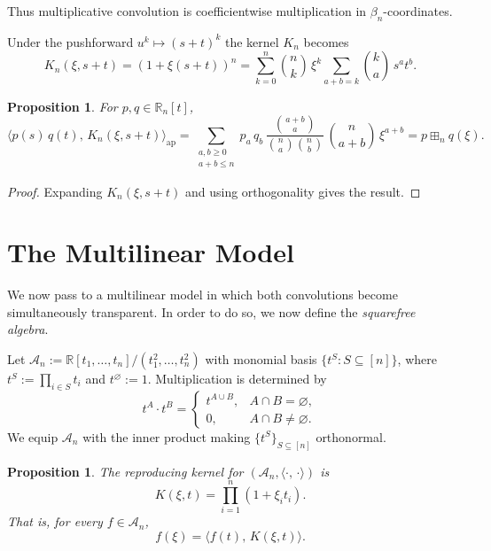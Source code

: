 \documentclass[11pt]{amsart}
\newtheorem{prop}[thm]{Proposition}
\theoremstyle{definition}
\newcommand{\R}{\mathbb{R}}
\newcommand{\ip}[2]{\langle #1,\, #2 \rangle}
\newcommand{\bn}[2]{{\textstyle\binom{#1}{#2}}}
\begin{document}
Thus multiplicative convolution is coefficientwise
multiplication in $\beta_n$-coordinates.

Under the pushforward $u^k\mapsto (s+t)^k$ the kernel $K_n$ becomes
\[
  K_n(\xi,s+t) = (1+\xi(s+t))^n
  = \sum_{k=0}^n \bn{n}{k}\,\xi^k
  \sum_{a+b=k}\bn{k}{a}\, s^a t^b.
\]

\begin{prop}\label{prop:add-conv-kernel}
For $p,q\in\R_n[t]$,
\[
  \ip{p(s)\,q(t)}{K_n(\xi,s+t)}_{\mathrm{ap}}
  = \sum_{\substack{a,b\ge 0\\ a+b\le n}}
  p_a\, q_b\,
  \frac{\binom{a+b}{a}}{\binom{n}{a}\binom{n}{b}}\,
  \binom{n}{a+b}\,\xi^{a+b} = p\boxplus_n q(\xi).
\]
\end{prop}

\begin{proof}
Expanding $K_n(\xi,s+t)$ and using orthogonality gives the
result.
\end{proof}


\section{The Multilinear Model}
\label{sec:multilinear}

We now pass to a multilinear model in which both convolutions
become simultaneously transparent. In order to do so, we now define the \emph{squarefree algebra}.

Let $\mathcal{A}_n := \R[t_1,\dots,t_n]/(t_1^2,\dots,t_n^2)$
with monomial basis $\{t^S : S\subseteq [n]\}$, where $t^S := \prod_{i\in S} t_i$ and $t^\varnothing := 1$.
Multiplication is determined by
\begin{equation}\label{eq:mult-rule}
  t^A \cdot t^B =
  \begin{cases}
    t^{A\cup B}, & A\cap B = \varnothing,\\
    0,            & A\cap B \neq \varnothing.
  \end{cases}
\end{equation}
We equip $\mathcal{A}_n$ with the inner product making $\{t^S\}_{S\subseteq[n]}$ orthonormal.

\begin{prop}\label{prop:ml-kernel}
The reproducing kernel for $(\mathcal{A}_n, \ip{\cdot}{\cdot})$
is
\[
  K(\xi,t) = \prod_{i=1}^n (1+\xi_i t_i).
\]
That is, for every $f\in\mathcal{A}_n$,
\[
  f(\xi) = \ip{f(t)}{K(\xi,t)}.
\]
\end{prop}
\end{document}
